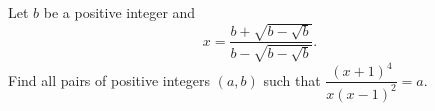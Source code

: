 Let $b$ be a positive integer and
\[x=\dfrac{b+\sqrt{b-\sqrt b}}{b-\sqrt{b-\sqrt b}}.\]
Find all pairs of positive integers $(a,b)$ such that $\dfrac{(x+1)^4}{x(x-1)^2}=a$.
